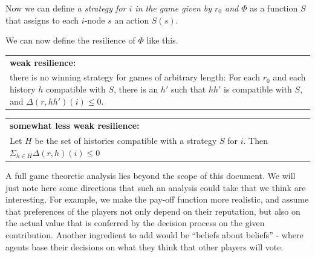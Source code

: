 \documentclass{article}
\newcommand{\flow}{\Phi}
\newenvironment{condition}[1]
	{
	\begin{center}
	   \begin{tabular}{|p{.9\textwidth}|}
		\hline \medskip
		{\bf #1:}\\
	}
	{
		\medskip \\\hline
	\end{tabular}
	\end{center}
	}
\begin{document}
Now we can define {\em a strategy for $i$ in the game given by $r_0$ and $\flow$} as a function $S$ that assigns to each $i$-node $s$ an action $S(s)$.

We can now define the resilience of $\Phi$ like this. 

\begin{condition}{weak resilience} 
there is no winning strategy for games of arbitrary length: For each $r_0$ and each history $h$ compatible with $S$, there is an $h'$ such that $hh'$ is compatible with $S$, and $\Delta(r, hh')(i) \leq 0$.
\end{condition}
\begin{condition}{somewhat less weak resilience} 
Let $H$ be the set of histories compatible with a strategy $S$ for $i$. Then $\Sigma_{h\in H} \Delta(r, h)(i) \leq 0$
\end{condition}
A full game theoretic analysis lies beyond the scope of this document. We will just note here some directions that such an analysis could take that we think are interesting. For example, we make the pay-off function more realistic, and assume that preferences of the players not only depend on their reputation, but also on the actual value that is conferred by the decision process on the given contribution. Another ingredient to add would be ``beliefs about beliefs'' - where agents base their decisions on what they think that other players will vote.






\end{document}
